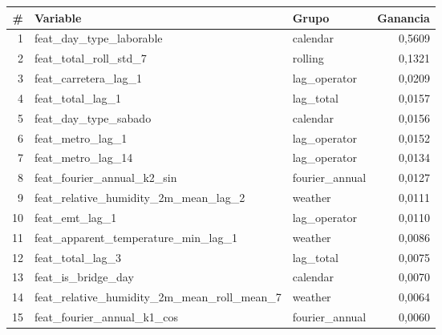 \begin{tabular}{rllr}
\toprule
\rowcolor{naranja}
\textbf{\#} & \textbf{Variable} & \textbf{Grupo} & \textbf{Ganancia} \\
\midrule
\rowcolor{filaclara} 1 & feat\_\allowbreak{}day\_\allowbreak{}type\_\allowbreak{}laborable & calendar & 0,5609 \\
2 & feat\_\allowbreak{}total\_\allowbreak{}roll\_\allowbreak{}std\_\allowbreak{}7 & rolling & 0,1321 \\
\rowcolor{filaclara} 3 & feat\_\allowbreak{}carretera\_\allowbreak{}lag\_\allowbreak{}1 & lag\_\allowbreak{}operator & 0,0209 \\
4 & feat\_\allowbreak{}total\_\allowbreak{}lag\_\allowbreak{}1 & lag\_\allowbreak{}total & 0,0157 \\
\rowcolor{filaclara} 5 & feat\_\allowbreak{}day\_\allowbreak{}type\_\allowbreak{}sabado & calendar & 0,0156 \\
6 & feat\_\allowbreak{}metro\_\allowbreak{}lag\_\allowbreak{}1 & lag\_\allowbreak{}operator & 0,0152 \\
\rowcolor{filaclara} 7 & feat\_\allowbreak{}metro\_\allowbreak{}lag\_\allowbreak{}14 & lag\_\allowbreak{}operator & 0,0134 \\
8 & feat\_\allowbreak{}fourier\_\allowbreak{}annual\_\allowbreak{}k2\_\allowbreak{}sin & fourier\_\allowbreak{}annual & 0,0127 \\
\rowcolor{filaclara} 9 & feat\_\allowbreak{}relative\_\allowbreak{}humidity\_\allowbreak{}2m\_\allowbreak{}mean\_\allowbreak{}lag\_\allowbreak{}2 & weather & 0,0111 \\
10 & feat\_\allowbreak{}emt\_\allowbreak{}lag\_\allowbreak{}1 & lag\_\allowbreak{}operator & 0,0110 \\
\rowcolor{filaclara} 11 & feat\_\allowbreak{}apparent\_\allowbreak{}temperature\_\allowbreak{}min\_\allowbreak{}lag\_\allowbreak{}1 & weather & 0,0086 \\
12 & feat\_\allowbreak{}total\_\allowbreak{}lag\_\allowbreak{}3 & lag\_\allowbreak{}total & 0,0075 \\
\rowcolor{filaclara} 13 & feat\_\allowbreak{}is\_\allowbreak{}bridge\_\allowbreak{}day & calendar & 0,0070 \\
14 & feat\_\allowbreak{}relative\_\allowbreak{}humidity\_\allowbreak{}2m\_\allowbreak{}mean\_\allowbreak{}roll\_\allowbreak{}mean\_\allowbreak{}7 & weather & 0,0064 \\
\rowcolor{filaclara} 15 & feat\_\allowbreak{}fourier\_\allowbreak{}annual\_\allowbreak{}k1\_\allowbreak{}cos & fourier\_\allowbreak{}annual & 0,0060 \\
\bottomrule
\end{tabular}
